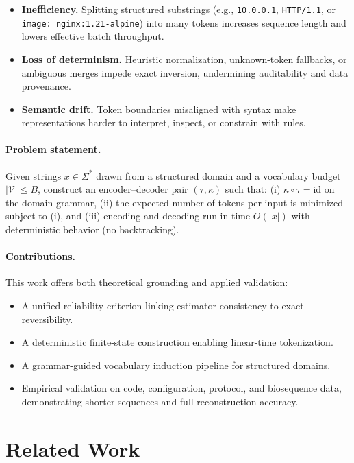 \begin{itemize}
  \item \textbf{Inefficiency.} Splitting structured substrings (e.g., \texttt{10.0.0.1}, \texttt{HTTP/1.1}, or \texttt{image: nginx:1.21-alpine}) into many tokens increases sequence length and lowers effective batch throughput.
  \item \textbf{Loss of determinism.} Heuristic normalization, unknown-token fallbacks, or ambiguous merges impede exact inversion, undermining auditability and data provenance.
  \item \textbf{Semantic drift.} Token boundaries misaligned with syntax make representations harder to interpret, inspect, or constrain with rules.
\end{itemize}

\paragraph{Problem statement.}
Given strings $x\!\in\!\Sigma^*$ drawn from a structured domain and a vocabulary budget $|\mathcal{V}|\!\le\!B$, construct an encoder–decoder pair $(\tau,\kappa)$ such that: (i) $\kappa\!\circ\!\tau\!=\!\mathrm{id}$ on the domain grammar, (ii) the expected number of tokens per input is minimized subject to (i), and (iii) encoding and decoding run in time $O(|x|)$ with deterministic behavior (no backtracking).

\paragraph{Contributions.}
This work offers both theoretical grounding and applied validation:
\begin{itemize}
    \item A unified reliability criterion linking estimator consistency to exact reversibility.
    \item A deterministic finite-state construction enabling linear-time tokenization.
    \item A grammar-guided vocabulary induction pipeline for structured domains.
    \item Empirical validation on code, configuration, protocol, and biosequence data, demonstrating shorter sequences and full reconstruction accuracy.
\end{itemize}

\section{Related Work}
\label{sec:related}

